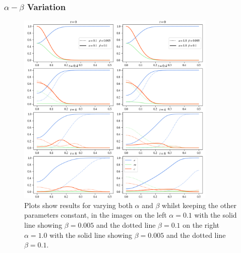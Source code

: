 \subsubsection*{$\alpha - \beta$ Variation}
\begin{figure}[h]
    \centering
    \includegraphics[width=0.85\textwidth]{resources/images/alpha_beta_variation.png}
    \caption{Plots show results for varying both $\alpha$ and $\beta$ whilst keeping the other parameters constant, in the images on the left $\alpha=0.1$ with the solid line showing $\beta = 0.005$ and the dotted line $\beta=0.1$ on the right $\alpha=1.0$ with the solid line showing $\beta = 0.005$ and the dotted line $\beta=0.1$.}
    \label{fig:alpha_beta_variation}
\end{figure}

